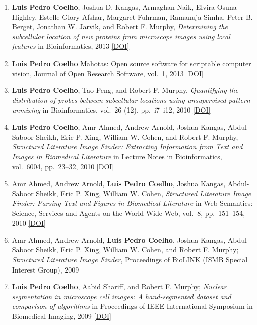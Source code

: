 \documentclass{article}
\newcommand\showdoi[1]{%
    \href{http://dx.doi.org/#1}{[DOI]}%
}
\begin{document}
\begin{enumerate}
\item \textbf{Luis Pedro Coelho}, Joshua D.  Kangas, Armaghan Naik, Elvira
Osuna-Highley, Estelle Glory-Afshar, Margaret Fuhrman, Ramanuja Simha, Peter B.
Berget, Jonathan W.  Jarvik, and Robert F. Murphy, \emph{Determining the
subcellular location of new proteins from microscope images using local
features} in Bioinformatics, 2013 \showdoi{10.1093/bioinformatics/btt392}

\item \textbf{Luis Pedro Coelho} Mahotas: Open source software for scriptable
computer vision, Journal of Open Research Software, vol.\ 1, 2013
\showdoi{10.5334/jors.ac}

\item \textbf{Luis Pedro Coelho}, Tao Peng, and Robert F. Murphy,
\emph{Quantifying the distribution of probes between subcellular locations
using unsupervised pattern unmixing} in Bioinformatics, vol.\ 26 (12), pp.\
i7--i12, 2010 \showdoi{10.1093/bioinformatics/btq220}

\item \textbf{Luis Pedro Coelho}, Amr Ahmed, Andrew Arnold, Joshua Kangas,
Abdul-Saboor Sheikh, Eric P. Xing, William W. Cohen, and Robert F. Murphy,
\emph{Structured Literature Image Finder: Extracting Information from Text and
Images in Biomedical Literature} in Lecture Notes in Bioinformatics, vol.\
6004, pp.\ 23--32, 2010 \showdoi{10.1007/978-3-642-13131-8_4}

\item Amr Ahmed, Andrew Arnold, \textbf{Luis Pedro Coelho}, Joshua Kangas,
Abdul-Saboor Sheikk, Eric P. Xing, William W. Cohen, \emph{Structured
Literature Image Finder: Parsing Text and Figures in Biomedical Literature} in
Web Semantics: Science, Services and Agents on the World Wide Web, vol.\ 8,
pp.\ 151--154, 2010 \showdoi{10.1016/j.websem.2010.04.002}

\item Amr Ahmed, Andrew Arnold, \textbf{Luis Pedro Coelho}, Joshua Kangas,
Abdul-Saboor Sheikk, Eric P. Xing, William W. Cohen, and Robert F. Murphy;
\emph{Structured Literature Image Finder}, Proceedings of BioLINK (ISMB Special
Interest Group), 2009

\item \textbf{Luis Pedro Coelho}, Aabid Shariff, and Robert F. Murphy;
\emph{Nuclear segmentation in microscope cell images: A hand-segmented dataset
and comparison of algorithms} in Proceedings of IEEE International Symposium in
Biomedical Imaging, 2009 \showdoi{10.1109/ISBI.2009.5193098}


\end{enumerate}
\end{document}
